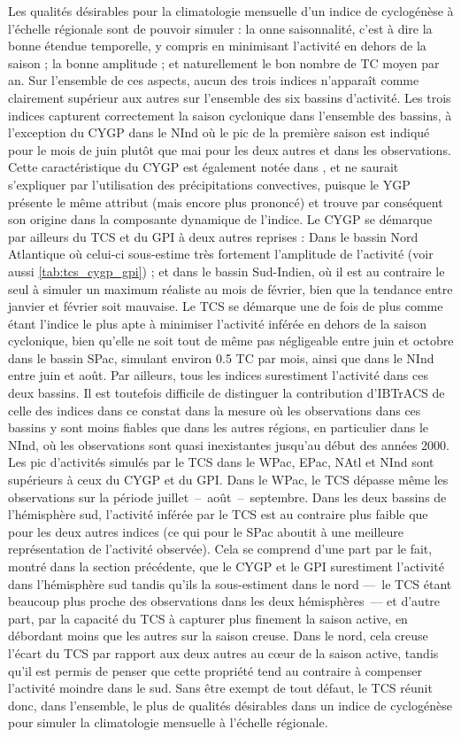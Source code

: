 \documentclass[../main.tex]{subfiles}
\begin{document}
Les qualités désirables pour la climatologie mensuelle d'un indice de cyclogénèse à l'échelle régionale sont de pouvoir simuler : la onne saisonnalité, c'est à
dire la bonne étendue temporelle, y compris en minimisant l'activité en dehors de la saison ; la bonne amplitude ; et naturellement le bon nombre de TC moyen
par an. Sur l'ensemble de ces aspects, aucun des trois indices n'apparaît comme clairement supérieur aux autres sur l'ensemble des six bassins d'activité. Les
trois indices capturent correctement la saison cyclonique dans l'ensemble des bassins, à l'exception du CYGP dans le NInd où le pic de la première saison est
indiqué pour le mois de juin plutôt que mai pour les deux autres et dans les observations. Cette caractéristique du CYGP est également notée dans
\textcite{menkes_comparison_2012}, et ne saurait s'expliquer par l'utilisation des précipitations convectives, puisque le YGP présente le même attribut (mais
encore plus prononcé) et trouve par conséquent son origine dans la composante dynamique de l'indice. Le CYGP se démarque par ailleurs du TCS et du GPI à deux
autres reprises : Dans le bassin Nord Atlantique où celui-ci sous-estime très fortement l'amplitude de l'activité (voir aussi \cref{tab:tcs_cygp_gpi}) ; et dans
le bassin Sud-Indien, où il est au contraire le seul à simuler un maximum réaliste au mois de février, bien que la tendance entre janvier et février soit
mauvaise. Le TCS se démarque une de fois de plus comme étant l'indice le plus apte à minimiser l'activité inférée en dehors de la saison cyclonique, bien
qu'elle ne soit tout de même pas négligeable entre juin et octobre dans le bassin SPac, simulant environ \num{0.5} TC par mois, ainsi que dans le NInd entre
juin et août. Par ailleurs, tous les indices surestiment l'activité dans ces deux bassins. Il est toutefois difficile de distinguer la contribution d'IBTrACS de
celle des indices dans ce constat dans la mesure où les observations dans ces bassins y sont moins fiables que dans les autres régions, en particulier dans le
NInd, où les observations sont quasi inexistantes jusqu'au début des années 2000. Les pic d'activités simulés par le TCS dans le WPac, EPac, NAtl et NInd sont
supérieurs à ceux du CYGP et du GPI. Dans le WPac, le TCS dépasse même les observations sur la période juillet~--~août~--~septembre. Dans les deux bassins de
l'hémisphère sud, l'activité inférée par le TCS est au contraire plus faible que pour les deux autres indices (ce qui pour le SPac aboutit à une meilleure
représentation de l'activité observée). Cela se comprend d'une part par le fait, montré dans la section précédente, que le CYGP et le GPI surestiment l'activité
dans l'hémisphère sud tandis qu'ils la sous-estiment dans le nord ---~le TCS étant beaucoup plus proche des observations dans les deux hémisphères~--- et
d'autre part, par la capacité du TCS à capturer plus finement la saison active, en débordant moins que les autres sur la saison creuse. Dans le nord, cela
creuse l'écart du TCS par rapport aux deux autres au cœur de la saison active, tandis qu'il est permis de penser que cette propriété tend au contraire à
compenser l'activité moindre dans le sud. Sans être exempt de tout défaut, le TCS réunit donc, dans l'ensemble, le plus de qualités désirables dans un indice de
cyclogénèse pour simuler la climatologie mensuelle à l'échelle régionale.
\end{document}
